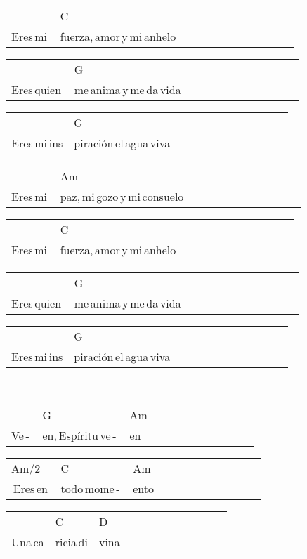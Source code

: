 \begin{multicols}{2}
\begin{minipage}{\columnwidth}
\noindent
\begin{tabular}{llllllllllll}
&C\\
Eres\,mi\,&fuerza,\,amor\,y\,mi\,anhelo
\end{tabular}

\noindent
\begin{tabular}{llllllllllll}
&G\\
Eres\,quien\,&me\,anima\,y\,me\,da\,vida
\end{tabular}

\noindent
\begin{tabular}{llllllllllll}
&G\\
Eres\,mi\,ins&piración\,el\,agua\,viva
\end{tabular}

\noindent
\begin{tabular}{llllllllllll}
&Am\\
Eres\,mi\,&paz,\,mi\,gozo\,y\,mi\,consuelo
\end{tabular}

\noindent
\begin{tabular}{llllllllllll}
&C\\
Eres\,mi\,&fuerza,\,amor\,y\,mi\,anhelo
\end{tabular}

\noindent
\begin{tabular}{llllllllllll}
&G\\
Eres\,quien\,&me\,anima\,y\,me\,da\,vida
\end{tabular}

\noindent
\begin{tabular}{llllllllllll}
&G\\
Eres\,mi\,ins&piración\,el\,agua\,viva
\end{tabular}
\end{minipage}\\

\noindent
\begin{minipage}{\columnwidth}
\noindent
\noindent
\begin{tabular}{llllllllllll}
&G&Am\\
Ve\,-\,&en,\,Espíritu\,ve\,-\,&en
\end{tabular}

\noindent
\begin{tabular}{llllllllllll}
Am{/}2&C&Am\\
\,Eres\,en\,&todo\,mome\,-\,&ento
\end{tabular}

\noindent
\begin{tabular}{llllllllllll}
&C&D\\
Una\,ca&ricia\,di&vina
\end{tabular}


\end{minipage}
\end{multicols}
